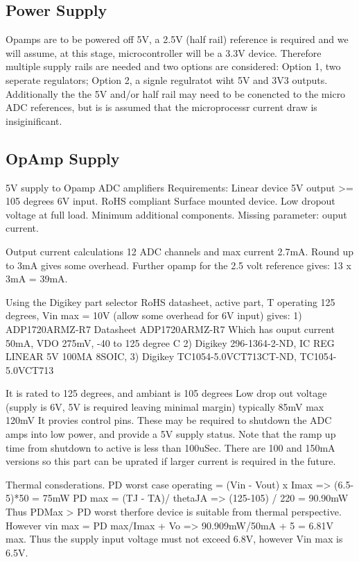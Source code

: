 \subsection{Power Supply}
Opamps are to be powered off 5V, a 2.5V (half rail) reference is required and we will assume, at this stage, microcontroller will be a 3.3V device. 
Therefore multiple supply rails are needed and two options are considered: Option 1, two seperate regulators; Option 2, a signle regulratot wiht 5V and 3V3 outputs. 
Additionally the the 5V and/or half rail may need to be conencted to the micro ADC references, but is is assumed that the microprocessr current draw is insiginificant.

\subsection{OpAmp Supply}
5V supply to Opamp ADC amplifiers
Requirements:
Linear device
5V output
>= 105 degrees
6V input.
RoHS compliant
Surface mounted device.
Low dropout voltage at full load. 
Minimum additional components.
Missing parameter: ouput current.

Output current calculations
12 ADC channels and max current 2.7mA. Round up to 3mA gives some overhead.
Further opamp for the 2.5 volt reference gives: 13 x 3mA = 39mA.

Using the Digikey part selector 
RoHS datasheet, active part, T operating 125 degrees, Vin max = 10V (allow some overhead for 6V input) gives:
1)
ADP1720ARMZ-R7
Datasheet ADP1720ARMZ-R7
Which has ouput current 50mA, VDO 275mV, -40 to 125 degree C
2)
Digikey 296-1364-2-ND, IC REG LINEAR 5V 100MA 8SOIC,
3)
Digikey TC1054-5.0VCT713CT-ND, TC1054-5.0VCT713 

It is rated to 125 degrees, and ambiant is 105 degrees
Low drop out voltage (supply is  6V, 5V is required leaving minimal margin) typically 85mV max 120mV
It provies control pins. These may be required to shutdown the ADC amps into low power, and provide a 5V supply status.
Note that the ramp up time from shutdown to active is less than 100uSec.
There are 100 and 150mA versions so this part can be uprated if larger current is required in the future.

Thermal consderations.
PD worst case operating = (Vin - Vout) x Imax => (6.5-5)*50 = 75mW
PD max = (TJ - TA)/ thetaJA => (125-105) / 220 = 90.90mW
Thus PDMax > PD worst therfore device is suitable from thermal perspective.
However vin max = PD max/Imax + Vo => 90.909mW/50mA + 5 = 6.81V max.
Thus the supply input voltage must not exceed 6.8V, however Vin max is 6.5V.

